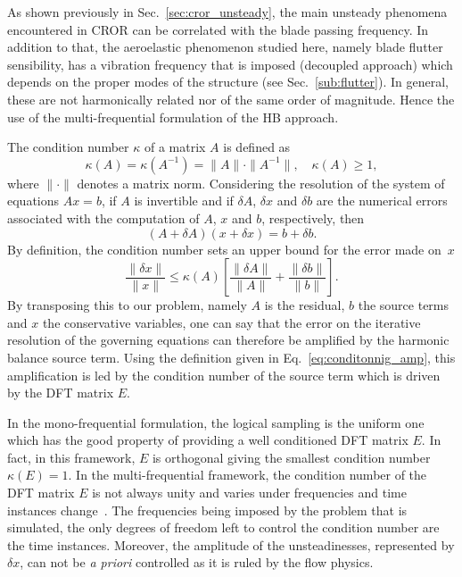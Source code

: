 
As shown previously in Sec.~\ref{sec:cror_unsteady}, the main unsteady
phenomena encountered in CROR can be correlated with the blade passing
frequency.
In addition to that, the aeroelastic phenomenon
studied here, namely blade flutter sensibility, has a vibration frequency that
is imposed (decoupled approach) which depends on the proper modes
of the structure (see Sec.~\ref{sub:flutter}).
In general, these are not harmonically related nor
of the same order of magnitude. Hence the use of the
multi-frequential formulation of the HB approach. 

The condition number $\kappa$ of a matrix $A$ is defined as
\begin{equation}
  \kappa (A) = \kappa (A^{-1}) = \| A \| \cdot \| A^{-1} \|, \quad
    \kappa(A) \geq 1,
\end{equation}
where $\| \cdot \|$ denotes a matrix norm. Considering the resolution
of the system of equations
$A x = b$, if $A$ is invertible and if $\delta A$, $\delta x$ and
$\delta b$ are the numerical errors associated with the computation of
$A$, $x$ and $b$, respectively, then
\begin{equation}
   (A + \delta A)(x + \delta x) = b + \delta b.
   \label{eq:error_reso}
\end{equation}
By definition, the condition number sets an upper bound for 
the error made on~$x$
\begin{equation}
   \frac{\| \delta x \|}{\| x \|} \leq 
   \kappa(A)\left[\frac{\| \delta A \|}{\| A \|} + 
   \frac{\| \delta b \|}{\| b \|} \right].
   \label{eq:conditonnig_amp}
\end{equation}
By transposing this to our problem, namely $A$ is the residual, 
$b$ the source terms and $x$ the conservative variables, one can say that
the error on the iterative resolution of the governing equations can
therefore be amplified by the harmonic balance source term.
Using the definition given in Eq.~\eqref{eq:conditonnig_amp}, this amplification is
led by the condition number of the source term which
is driven by the DFT matrix $E$. 


In the mono-frequential formulation, the logical sampling is the uniform one
which has the good property of providing
a well conditioned DFT matrix $E$. In fact, in this framework, $E$ is orthogonal giving 
the smallest condition number $\kappa (E) = 1$.
In the multi-frequential framework,
the condition number of the DFT matrix $E$ is not always unity and
varies under frequencies and time instances change~\cite{Kundert1988}. 
The frequencies
being imposed by the problem that is simulated,
the only degrees of freedom left to control the condition
number are the time instances. 
Moreover, the amplitude of the unsteadinesses, represented by $\delta x$,
can not be \emph{a priori} controlled as it is ruled by the flow physics. 

